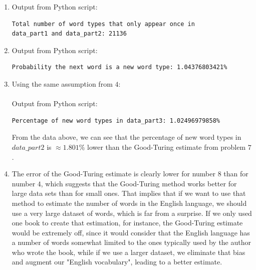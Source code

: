 \documentclass[11pt]{article}
\begin{document}
\begin {enumerate}
\item
Output from Python script:
\begin{verbatim}
Total number of word types that only appear once in
data_part1 and data_part2: 21136
\end{verbatim}

\item
Output from Python script:
\begin{verbatim}
Probability the next word is a new word type: 1.04376803421%
\end{verbatim}

\item
Using the same assumption from $4$:
\\
\\
Output from Python script:
\begin{verbatim}
Percentage of new word types in data_part3: 1.02496979858%
\end{verbatim}
From the data above, we can see that the percentage of new word types in $data\_part2$ is $\approx1.801\%$ lower than the Good-Turing estimate from problem $7$.

\item
The error of the Good-Turing estimate is clearly lower for number $8$ than for number $4$, which suggests that the Good-Turing method works better for large data sets than for small ones. That implies that if we want to use that method to estimate the number of words in the English language, we should use a very large dataset of words,  which is far from a surprise. If we only used one book to create that estimation, for instance, the Good-Turing estimate would be extremely off, since it would consider that the English language has a number of words somewhat limited to the ones typically used by the author who wrote the book, while if we use a larger dataset, we eliminate that bias and augment our "English vocabulary", leading to a better estimate. 


\end{enumerate}
\end{document}
